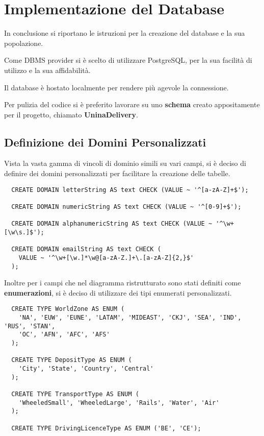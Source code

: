 \chapter{Implementazione del Database}

In conclusione si riportano le istruzioni per la creazione del database e la sua popolazione.

Come DBMS provider si è scelto di utilizzare PostgreSQL, per la sua facilità di utilizzo e la sua affidabilità.

Il database è hostato localmente per rendere più agevole la connessione.

Per pulizia del codice si è preferito lavorare su uno \textbf{schema} creato appositamente per il progetto, chiamato \textbf{UninaDelivery}.

\section{Definizione dei Domini Personalizzati}

Vista la vasta gamma di vincoli di dominio simili su vari campi, si è deciso di definire dei domini personalizzati per facilitare la creazione delle tabelle.

\begin{lstlisting}
  CREATE DOMAIN letterString AS text CHECK (VALUE ~ '^[a-zA-Z]+$');
  
  CREATE DOMAIN numericString AS text CHECK (VALUE ~ '^[0-9]+$');
  
  CREATE DOMAIN alphanumericString AS text CHECK (VALUE ~ '^\w+[\w\s.]$');
  
  CREATE DOMAIN emailString AS text CHECK (
    VALUE ~ '^\w+[\w.]*\w@[a-zA-Z.]+\.[a-zA-Z]{2,}$'
  );
\end{lstlisting}

Inoltre per i campi che nel diagramma ristrutturato sono stati definiti come \textbf{enumerazioni}, si è deciso di utilizzare dei tipi enumerati personalizzati.
\begin{lstlisting}
  CREATE TYPE WorldZone AS ENUM (
    'NA', 'EUW', 'EUNE', 'LATAM', 'MIDEAST', 'CKJ', 'SEA', 'IND', 'RUS', 'STAN', 
    'OC', 'AFN', 'AFC', 'AFS'
  );

  CREATE TYPE DepositType AS ENUM (
    'City', 'State', 'Country', 'Central'
  );

  CREATE TYPE TransportType AS ENUM (
    'WheeledSmall', 'WheeledLarge', 'Rails', 'Water', 'Air'
  );
  
  CREATE TYPE DrivingLicenceType AS ENUM ('BE', 'CE');
\end{lstlisting}


